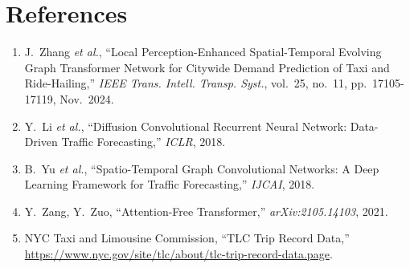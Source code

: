 \documentclass{rapportECL}
\begin{document}
\section*{References}

\begin{enumerate}[leftmargin=*]
    \item J.~Zhang \textit{et al.}, ``Local Perception-Enhanced Spatial-Temporal Evolving Graph Transformer Network for Citywide Demand Prediction of Taxi and Ride-Hailing,'' \textit{IEEE Trans. Intell. Transp. Syst.}, vol.~25, no.~11, pp.~17105-17119, Nov.~2024.
    \item Y.~Li \textit{et al.}, ``Diffusion Convolutional Recurrent Neural Network: Data-Driven Traffic Forecasting,'' \textit{ICLR}, 2018.
    \item B.~Yu \textit{et al.}, ``Spatio-Temporal Graph Convolutional Networks: A Deep Learning Framework for Traffic Forecasting,'' \textit{IJCAI}, 2018.
    \item Y.~Zang, Y.~Zuo, ``Attention-Free Transformer,'' \textit{arXiv:2105.14103}, 2021.
    \item NYC Taxi and Limousine Commission, ``TLC Trip Record Data,'' \url{https://www.nyc.gov/site/tlc/about/tlc-trip-record-data.page}.
\end{enumerate}
\end{document}
